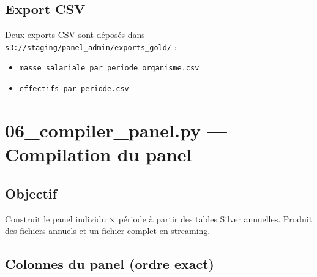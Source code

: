 \documentclass[12pt,a4paper,french]{report}
\newcommand{\bucket}[1]{\texttt{s3://#1}}
\begin{document}
\subsection{Export CSV}

Deux exports CSV sont déposés dans
\bucket{staging/panel\_admin/exports\_gold/} :
\begin{itemize}[nosep]
  \item \texttt{masse\_salariale\_par\_periode\_organisme.csv}
  \item \texttt{effectifs\_par\_periode.csv}
\end{itemize}

\section{06\_compiler\_panel.py — Compilation du panel}

\subsection{Objectif}

Construit le panel individu $\times$ période à partir des tables Silver
annuelles. Produit des fichiers annuels et un fichier complet en streaming.

\subsection{Colonnes du panel (ordre exact)}
\end{document}
